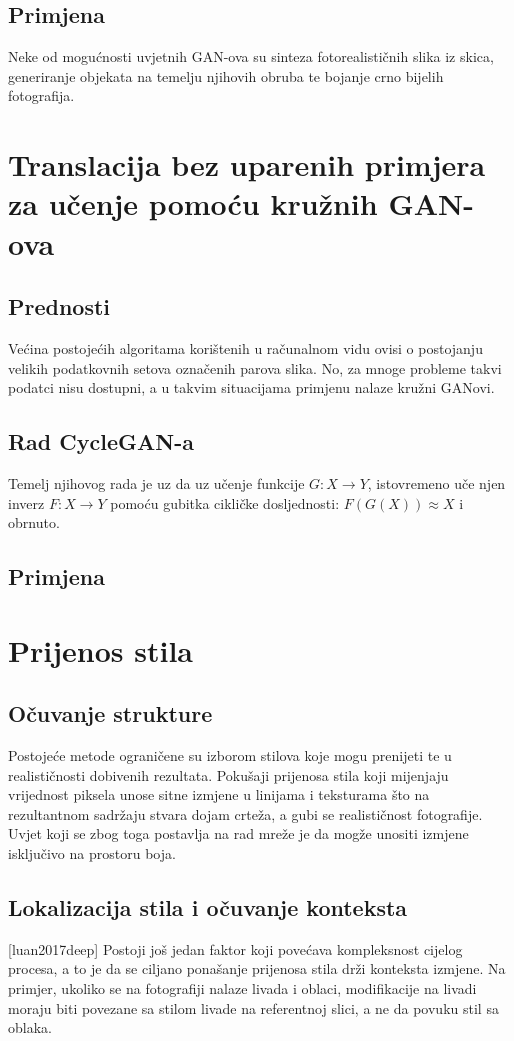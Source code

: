 \documentclass[lmodern, utf8, seminar]{fer}
\begin{document}
\section{Primjena}
Neke od mogućnosti uvjetnih GAN-ova su sinteza fotorealističnih slika iz skica, generiranje objekata na temelju njihovih obruba te bojanje crno bijelih fotografija.



\chapter{Translacija bez uparenih primjera za učenje pomoću kružnih GAN-ova}
\section{Prednosti}
Većina postojećih algoritama korištenih u računalnom vidu ovisi o postojanju velikih podatkovnih setova označenih parova slika. No, za mnoge probleme takvi podatci nisu dostupni, a u takvim situacijama primjenu nalaze kružni GANovi.
\newline

\section{Rad CycleGAN-a}
Temelj njihovog rada je uz da uz učenje funkcije $G: X \rightarrow Y$, istovremeno uče njen inverz $F: X \rightarrow Y$ pomoću gubitka cikličke dosljednosti: $F(G(X)) \approx X$ i obrnuto.
\section{Primjena}


\chapter{Prijenos stila}
\section{Očuvanje strukture}
Postojeće metode ograničene su izborom stilova koje mogu prenijeti te u realističnosti dobivenih rezultata. Pokušaji prijenosa stila koji mijenjaju vrijednost piksela unose sitne izmjene u linijama i teksturama što na rezultantnom sadržaju stvara dojam crteža, a gubi se realističnost fotografije. Uvjet koji se zbog toga postavlja na rad mreže je da mogže unositi izmjene isključivo na prostoru boja.

\section{Lokalizacija stila i očuvanje konteksta} [luan2017deep]
Postoji još jedan faktor koji povećava kompleksnost cijelog procesa, a to je da se ciljano ponašanje prijenosa stila drži konteksta izmjene. Na primjer, ukoliko se na fotografiji nalaze livada i oblaci, modifikacije na livadi moraju biti povezane sa stilom livade na referentnoj slici, a ne da povuku stil sa oblaka. 
\end{document}
